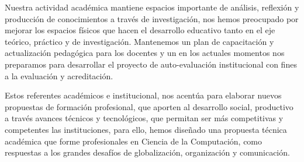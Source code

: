 Nuestra actividad académica mantiene espacios importante de análisis, 
reflexión y producción de conocimientos a través de investigación, nos 
hemos preocupado por mejorar los espacios físicos que hacen el desarrollo 
educativo tanto en el eje teórico, práctico y de investigación.  Mantenemos 
un plan de capacitación y actualización pedagógica para los docentes y un en 
los actuales momentos nos preparamos para desarrollar el proyecto de 
auto-evaluación  institucional con fines a la evaluación y acreditación.

Estos referentes  académicos e institucional, nos  acentúa para
elaborar nuevos propuestas  de formación profesional, que aporten al 
desarrollo social, productivo a través avances  técnicos  y tecnológicos, 
que permitan ser más competitivas y competentes las instituciones, para ello, 
hemos diseñado una propuesta técnica académica que forme profesionales en 
Ciencia de la Computación, como respuestas a los 
grandes desafíos de globalización, organización y comunicación.
